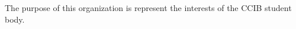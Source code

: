 \subsection{}

The purpose of this organization is represent the interests of the CCIB student body.